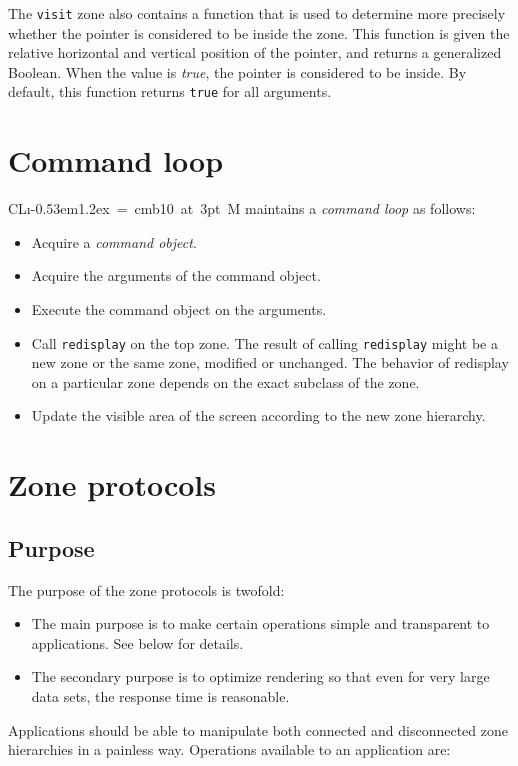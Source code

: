 \documentclass{report}
\def\Tiny{ \font\Tinyfont = cmb10 at 3pt \relax  \Tinyfont}
\def\clim{\textsf{CL{\i}\kern-0.53em\raise1.2ex\hbox{\Tiny 3}M}}
\def\code#1{\texttt{#1}}
\begin{document}
The \code{visit} zone also contains a function that is used to
determine more precisely whether the pointer is considered to be
inside the zone.  This function is given the relative horizontal and
vertical position of the pointer, and returns a generalized Boolean.
When the value is \emph{true}, the pointer is considered to be
inside.  By default, this function returns \texttt{true} for all
arguments. 

\chapter{Command loop}

\clim{} maintains a \emph{command loop} as follows:

\begin{itemize}
\item Acquire a \emph{command object}.
\item Acquire the arguments of the command object.
\item Execute the command object on the arguments.
\item Call \code{redisplay} on the top zone.  The result of calling
  \code{redisplay} might be a new zone or the same zone, modified
  or unchanged.  The behavior of redisplay on a particular zone
  depends on the exact subclass of the zone.
\item Update the visible area of the screen according to the new
  zone hierarchy.
\end{itemize}

\chapter{Zone protocols}

\section{Purpose}

The purpose of the zone protocols is twofold:

\begin{itemize}
\item The main purpose is to make certain operations simple and
  transparent to applications.  See below for details.
\item The secondary purpose is to optimize rendering so that even for
  very large data sets, the response time is reasonable.
\end{itemize}

Applications should be able to manipulate both connected and
disconnected zone hierarchies in a painless way.  Operations available
to an application are:
\end{document}
